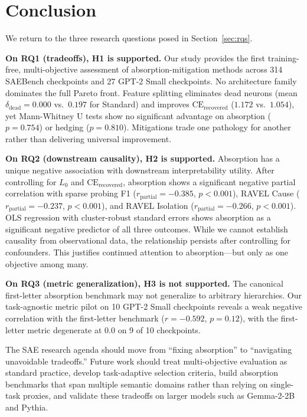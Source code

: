 \documentclass{article}
\begin{document}
\section{Conclusion}
\label{sec:conclusion}

We return to the three research questions posed in Section~\ref{sec:rqs}.

\textbf{On RQ1 (tradeoffs), H1 is supported.} Our study provides the first training-free, multi-objective assessment of absorption-mitigation methods across 314 SAEBench checkpoints and 27 GPT-2 Small checkpoints. No architecture family dominates the full Pareto front. Feature splitting eliminates dead neurons (mean $\delta_{\text{dead}} = 0.000$ vs.~$0.197$ for Standard) and improves $\text{CE}_{\text{recovered}}$ ($1.172$ vs.~$1.054$), yet Mann-Whitney U tests show no significant advantage on absorption ($p = 0.754$) or hedging ($p = 0.810$). Mitigations trade one pathology for another rather than delivering universal improvement.

\textbf{On RQ2 (downstream causality), H2 is supported.} Absorption has a unique negative association with downstream interpretability utility. After controlling for $L_0$ and $\text{CE}_{\text{recovered}}$, absorption shows a significant negative partial correlation with sparse probing F1 ($r_{\text{partial}} = -0.385$, $p < 0.001$), RAVEL Cause ($r_{\text{partial}} = -0.237$, $p < 0.001$), and RAVEL Isolation ($r_{\text{partial}} = -0.266$, $p < 0.001$). OLS regression with cluster-robust standard errors shows absorption as a significant negative predictor of all three outcomes. While we cannot establish causality from observational data, the relationship persists after controlling for confounders. This justifies continued attention to absorption---but only as one objective among many.

\textbf{On RQ3 (metric generalization), H3 is not supported.} The canonical first-letter absorption benchmark may not generalize to arbitrary hierarchies. Our task-agnostic metric pilot on 10 GPT-2 Small checkpoints reveals a weak negative correlation with the first-letter benchmark ($r = -0.592$, $p = 0.12$), with the first-letter metric degenerate at $0.0$ on 9 of 10 checkpoints.

The SAE research agenda should move from ``fixing absorption'' to ``navigating unavoidable tradeoffs.'' Future work should treat multi-objective evaluation as standard practice, develop task-adaptive selection criteria, build absorption benchmarks that span multiple semantic domains rather than relying on single-task proxies, and validate these tradeoffs on larger models such as Gemma-2-2B and Pythia.



\end{document}
